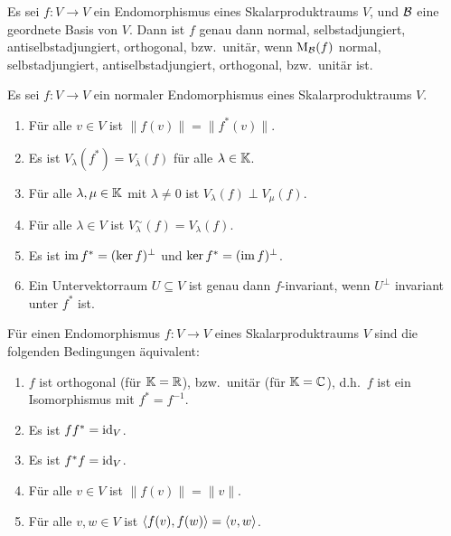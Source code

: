 \begin{proposition}
  Es sei $f \colon V \to V$ ein Endomorphismus eines Skalarproduktraums $V$, und $\mathcal{B}$ eine geordnete Basis von $V$.
  Dann ist $f$ genau dann normal, selbstadjungiert, antiselbstadjungiert, orthogonal, bzw.\ unitär, wenn $\mathrm{M}_{\mathcal{B}}(f)$ normal, selbstadjungiert, antiselbstadjungiert, orthogonal, bzw.\ unitär ist.
\end{proposition}


\begin{proposition}
  Es sei $f \colon V \to V$ ein normaler Endomorphismus eines Skalarproduktraums $V$.
  \begin{enumerate}[leftmargin=*, label=\roman*)]
    \item
      Für alle $v \in V$ ist $\|f(v)\| = \|f^*(v)\|$.
    \item
      Es ist $V_\lambda(f^*) = V_{\overline{\lambda}}(f)$ für alle $\lambda \in \mathbb{K}$.
    \item
      Für alle $\lambda, \mu \in \mathbb{K}$ mit $\lambda \neq 0$ ist $V_\lambda(f) \perp V_\mu(f)$.
    \item
      Für alle $\lambda \in V$ ist $V^\sim_\lambda(f) = V_\lambda(f)$.
    \item
      Es ist $\operatorname{im} f^* = (\ker f)^\perp$ und $\ker f^* = (\operatorname{im} f)^\perp$.
    \item
      Ein Untervektorraum $U \subseteq V$ ist genau dann $f$-invariant, wenn $U^\perp$ invariant unter $f^*$ ist.
  \end{enumerate}
\end{proposition}


\begin{proposition}
  Für einen Endomorphismus $f \colon V \to V$ eines Skalarproduktraums $V$ sind die folgenden Bedingungen äquivalent:
  \begin{enumerate}[leftmargin=*, label=\roman*)]
    \item
      $f$ ist orthogonal (für $\mathbb{K} = \mathbb{R}$), bzw.\ unitär (für $\mathbb{K} = \mathbb{C}$), d.h.\ $f$ ist ein Isomorphismus mit $f^* = f^{-1}$.
    \item
      Es ist $f f^* = \operatorname{id}_V$.
    \item
      Es ist $f^* f = \operatorname{id}_V$.
    \item
      Für alle $v \in V$ ist $\|f(v)\| = \|v\|$.
    \item
      Für alle $v, w \in V$ ist $\left\langle f(v), f(w) \right\rangle = \left\langle v,w \right\rangle$.
  \end{enumerate}
\end{proposition}


